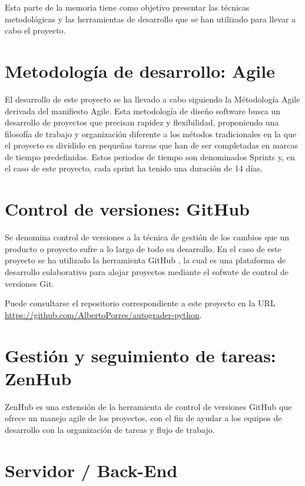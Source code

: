 
Esta parte de la memoria tiene como objetivo presentar las técnicas metodológicas y las herramientas de desarrollo que se han utilizado para llevar a cabo el proyecto.

\section{Metodología de desarrollo: Agile}

El desarrollo de este proyecto se ha llevado a cabo siguiendo la Métodología Agile\cite{MetodologiaAgile} derivada del manifiesto Agile\cite{ManifiestoAgile}. Esta metodología de diseño software busca un desarrollo de proyectos que precisan rapidez y flexibilidad, proponiendo una filosofía de trabajo y organización diferente a los métodos tradicionales en la que el proyecto es dividido en pequeñas tareas que han de ser completadas en marcas de tiempo predefinidas. Estos periodos de tiempo son denominados Sprints y, en el caso de este proyecto, cada sprint ha tenido una duración de 14 días.

\section{Control de versiones: GitHub}

Se denomina control de versiones a la técnica de gestión de los cambios que un producto o proyecto sufre a lo largo de todo su desarrollo. En el caso de este proyecto se ha utilizado la herramienta GitHub \cite{tool:GitHub}, la cual es una plataforma de desarrollo colaborativo para alojar proyectos mediante el sofwate de control de versiones Git.

Puede consultarse el repositorio correspondiente a este proyecto en la URL \url{https://github.com/AlbertoPorres/autograder-python}.

\section{Gestión y seguimiento de tareas: ZenHub}

ZenHub\cite{tool:ZenHub} es una extensión de la herramienta de control de versiones GitHub que ofrece un manejo agile de los proyectos, con el fin de ayudar a los equipos de desarrollo con la organización de tareas y flujo de trabajo.


\section{Servidor / Back-End}

